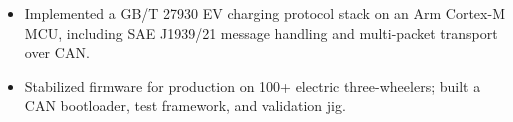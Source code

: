 \begin{itemize}
  \item Implemented a GB/T 27930 EV charging protocol stack on an Arm Cortex-M MCU, including SAE J1939/21 message handling and multi-packet transport over CAN.
  \item Stabilized firmware for production on 100+ electric three-wheelers; built a CAN bootloader, test framework, and validation jig.
\end{itemize}
